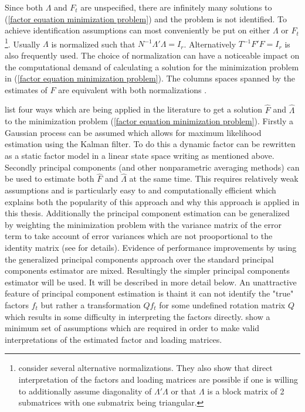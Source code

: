 \documentclass[12pt]{article}
\begin{document}
Since both $\Lambda$ and $F_t$ are unspecified, there are infinitely many solutions to (\ref{factor equation minimization problem}) and the problem is not identified. To achieve identification assumptions can most conveniently be put on either $\Lambda$ or $F_t$\footnote{\citet{bai2013principal} consider several alternative normalizations. They also show that direct interpretation of the factors and loading matrices are possible if one is willing to additionally assume diagonality of $\Lambda'\Lambda$ or that $\Lambda$ is a block matrix of 2 submatrices with one submatrix being triangular.}. Usually $\Lambda$ is normalized such that $N^{-1} \Lambda'\Lambda = I_r$. Alternatively $T^{-1}F'F = I_r$ is also frequently used. The choice of normalization can have a noticeable impact on the computational demand of calculating a solution for the minimization problem in (\ref{factor equation minimization problem}). The columns spaces spanned by the estimates of $F$ are equivalent with both normalizations \citep{stock2011dynamic}.

\citet{stock2011dynamic} list four ways which are being applied in the literature to get a solution $\hat F$ and $\hat \Lambda$ to the minimization problem (\ref{factor equation minimization problem}). Firstly a Gaussian process can be assumed which allows for maximum likelihood estimation using the Kalman filter. To do this a dynamic factor can be rewritten as a static factor model in a linear state space writing as mentioned above. \\
Secondly principal components (and other nonparametric averaging methods) can be used to estimate both $\hat F$ and $\hat \Lambda$ at the same time. This requires relatively weak assumptions and is particularly easy to and computationally efficient which explains both the popularity of this approach and why this approach is applied in this thesis. Additionally the principal component estimation can be generalized by weighting the minimization problem with the variance matrix of the error term to take account of error variances which are not prooportional to the identity matrix (see \citet{stock2011dynamic} for details). Evidence of performance improvements by using the generalized principal components approach over the standard principal components estimator are mixed. Resultingly the simpler principal components estimator will be used. It will be described in more detail below. An unattractive feature of principal component estimation is thaint it can not identify the "true" factors $f_t$ but rather a transformation $Q f_t$ for some undefined rotation matrix $Q$ which results in some difficulty in interpreting the factors directly. \citet{bai2013principal} show a minimum set of assumptions which are required in order to make valid interpretations of the estimated factor and loading matrices.
\end{document}
